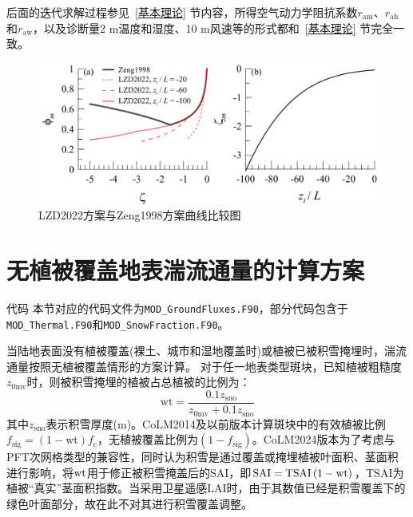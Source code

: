 后面的迭代求解过程参见~\ref{基本理论} 节内容，所得空气动力学阻抗系数$r_{\mathrm{am}}$、$r_{\mathrm{ah}}$和$r_{\mathrm{aw}}$，以及诊断量2 m温度和湿度、10 m风速等的形式都和~\ref{基本理论} 节完全一致。
{
  \begin{figure}[htbp]
    \centering
    \includegraphics[scale=0.7]{Figures/地表湍流交换过程/LZD2022方案与Zeng1998方案曲线比较图.png}
    \caption{LZD2022方案与Zeng1998方案曲线比较图}
    \label{fig:LZD2022方案与Zeng1998方案曲线比较图}
  \end{figure}
}


\section{无植被覆盖地表湍流通量的计算方案}\label{无植被覆盖地表湍流通量的计算方案}
\begin{mymdframed}{代码}
  本节对应的代码文件为\texttt{MOD\_GroundFluxes.F90}，部分代码包含于\texttt{MOD\_Thermal.F90}和\texttt{MOD\_SnowFraction.F90}。
\end{mymdframed}

当陆地表面没有植被覆盖(裸土、城市和湿地覆盖时)或植被已被积雪掩埋时，湍流通量按照无植被覆盖情形的方案计算。
对于任一地表类型斑块，已知植被粗糙度$z_{\mathrm{0mv}}$时，则被积雪掩埋的植被占总植被的比例为：
\begin{equation}
  {\mathrm {wt}}=\frac{0.1 z_{\mathrm{sno}}}{z_{\mathrm{0mv}}+0.1 z_{\mathrm{sno}}}
\end{equation}
其中$z_{\mathrm{sno}}$表示积雪厚度(m)。CoLM2014及以前版本计算斑块中的有效植被比例$f_{\mathrm{sig}}=\left(1-{\mathrm {wt}}\right)f_{\mathrm{c}}$，无植被覆盖比例为$\left(1-f_{\mathrm{sig}}\right)$。CoLM2024版本为了考虑与PFT次网格类型的兼容性，同时认为积雪是通过覆盖或掩埋植被叶面积、茎面积进行影响，将$\rm wt$用于修正被积雪掩盖后的SAI，即${\rm SAI=TSAI}\left(1-{\mathrm {wt}}\right)$，TSAI为植被“真实”茎面积指数。当采用卫星遥感LAI时，由于其数值已经是积雪覆盖下的绿色叶面部分，故在此不对其进行积雪覆盖调整。


